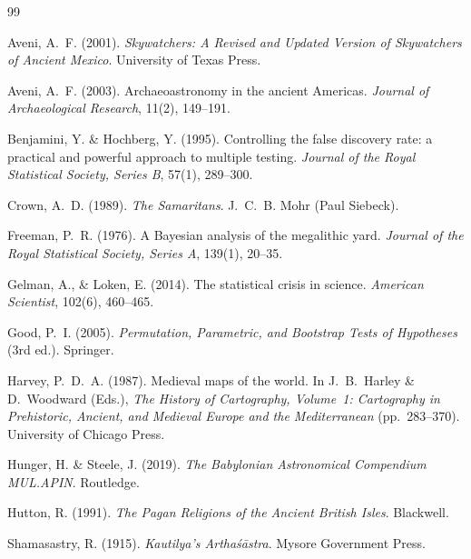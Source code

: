 \documentclass[12pt,a4paper]{article}
\begin{document}
\begin{thebibliography}{99}

Aveni, A.~F. (2001).
\textit{Skywatchers: A Revised and Updated Version of Skywatchers of
Ancient Mexico}.
University of Texas Press.

Aveni, A.~F. (2003).
Archaeoastronomy in the ancient Americas.
\textit{Journal of Archaeological Research}, 11(2), 149--191.

Benjamini, Y. \& Hochberg, Y. (1995).
Controlling the false discovery rate: a practical and powerful approach
to multiple testing.
\textit{Journal of the Royal Statistical Society, Series B}, 57(1), 289--300.

Crown, A.~D. (1989).
\textit{The Samaritans}.
J.~C.~B. Mohr (Paul Siebeck).

Freeman, P.~R. (1976).
A Bayesian analysis of the megalithic yard.
\textit{Journal of the Royal Statistical Society, Series A}, 139(1), 20--35.

Gelman, A., \& Loken, E. (2014).
The statistical crisis in science.
\textit{American Scientist}, 102(6), 460--465.

Good, P.~I. (2005).
\textit{Permutation, Parametric, and Bootstrap Tests of Hypotheses}
(3rd ed.).
Springer.

Harvey, P.~D.~A. (1987).
Medieval maps of the world.
In J.~B.~Harley \& D.~Woodward (Eds.),
\textit{The History of Cartography, Volume~1:
Cartography in Prehistoric, Ancient, and Medieval Europe
and the Mediterranean} (pp.~283--370).
University of Chicago Press.

Hunger, H. \& Steele, J. (2019).
\textit{The Babylonian Astronomical Compendium MUL.APIN}.
Routledge.

Hutton, R. (1991).
\textit{The Pagan Religions of the Ancient British Isles}.
Blackwell.

Shamasastry, R. (1915).
\textit{Kautilya's Artha\'{s}\={a}stra}.
Mysore Government Press.


\end{thebibliography}
\end{document}
